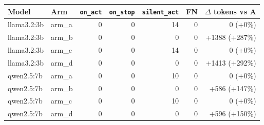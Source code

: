 \begin{tabular}{@{}llrrrrr@{}}
\toprule
Model & Arm & \texttt{on\_act} & \texttt{on\_stop} & \texttt{silent\_act} & FN & $\Delta$ tokens vs A \\
\midrule
llama3.2:3b & arm\_a & 0 & 0 & 14 & 0 & 0 (+0\%) \\
llama3.2:3b & arm\_b & 0 & 0 & 0 & 0 & +1388 (+287\%) \\
llama3.2:3b & arm\_c & 0 & 0 & 14 & 0 & 0 (+0\%) \\
llama3.2:3b & arm\_d & 0 & 0 & 0 & 0 & +1413 (+292\%) \\
qwen2.5:7b & arm\_a & 0 & 0 & 10 & 0 & 0 (+0\%) \\
qwen2.5:7b & arm\_b & 0 & 0 & 0 & 0 & +586 (+147\%) \\
qwen2.5:7b & arm\_c & 0 & 0 & 10 & 0 & 0 (+0\%) \\
qwen2.5:7b & arm\_d & 0 & 0 & 0 & 0 & +596 (+150\%) \\
\bottomrule
\end{tabular}
